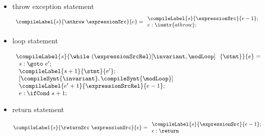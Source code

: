 \begin{itemize}
 \item throw exception statement
 $$\begin{array}{l} 
             \compileLabel{s}{\athrow \ \expressionSrc}{e} = 
             \begin{array}{l} 
	           \compileLabel{s}{ \expressionSrc}{e - 1}; \\
	           e: \instr{athrow}; 
	        \end{array} \\
		 
 \end{array}$$ 
                               

      \item loop statement

 $$\begin{array}{l} \compileLabel{s}{\while \ (\expressionSrcRel) \lbrack \invariant, \modLoop \rbrack \ \do \ \{ \stmt \} }{e} = \\
         \begin{array}{l}
              s: \goto \ e'; \\
	      \compileLabel{s +  1}{\stmt}{e'}; \\
	      \lbrack  \compileSynt{\invariant} , \compileSynt{\modLoop} \rbrack \\ 
	      \compileLabel{e' +  1}{\expressionSrcRel}{e  -1 };\\
	      e: \ifCond \ s +  1; \\
	      
	 \end{array}
    \end{array}
$$



 \item return statement

 $$ \compileLabel{s}{\returnSrc  \  \expressionSrc }{e } =  
\begin{array}{l} 
\compileLabel{s}{ \expressionSrc }{e - 1};\\
 e : \return
\end{array}   $$
\end{itemize}


